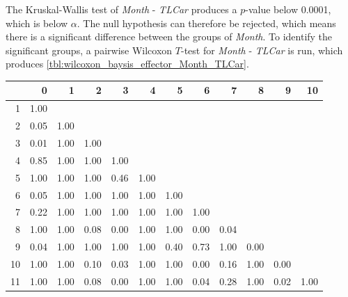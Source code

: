 The Kruskal-Wallis test of \textit{Month} - \textit{TLCar} produces a $p$-value below 0.0001, which is below $\alpha$. The null hypothesis can therefore be rejected, which means there is a significant difference between the groups of \textit{Month}. To identify the significant groups, a pairwise Wilcoxon $T$-test for \textit{Month} - \textit{TLCar} is run, which produces \cref{tbl:wilcoxon_baysis_effector_Month_TLCar}. 
% 
\begin{tabular}{rrrrrrrrrrrr}
  \hline
 & 0 & 1 & 2 & 3 & 4 & 5 & 6 & 7 & 8 & 9 & 10 \\ 
  \hline
1 & 1.00 &  &  &  &  &  &  &  &  &  &  \\ 
  2 & 0.05 & 1.00 &  &  &  &  &  &  &  &  &  \\ 
  3 & 0.01 & 1.00 & 1.00 &  &  &  &  &  &  &  &  \\ 
  4 & 0.85 & 1.00 & 1.00 & 1.00 &  &  &  &  &  &  &  \\ 
  5 & 1.00 & 1.00 & 1.00 & 0.46 & 1.00 &  &  &  &  &  &  \\ 
  6 & 0.05 & 1.00 & 1.00 & 1.00 & 1.00 & 1.00 &  &  &  &  &  \\ 
  7 & 0.22 & 1.00 & 1.00 & 1.00 & 1.00 & 1.00 & 1.00 &  &  &  &  \\ 
  8 & 1.00 & 1.00 & 0.08 & 0.00 & 1.00 & 1.00 & 0.00 & 0.04 &  &  &  \\ 
  9 & 0.04 & 1.00 & 1.00 & 1.00 & 1.00 & 0.40 & 0.73 & 1.00 & 0.00 &  &  \\ 
  10 & 1.00 & 1.00 & 0.10 & 0.03 & 1.00 & 1.00 & 0.00 & 0.16 & 1.00 & 0.00 &  \\ 
  11 & 1.00 & 1.00 & 0.08 & 0.00 & 1.00 & 1.00 & 0.04 & 0.28 & 1.00 & 0.02 & 1.00 \\ 
   \hline
\end{tabular}
% 
